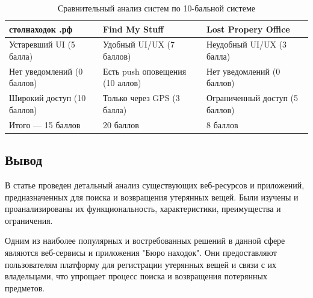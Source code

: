 \documentclass{mirea-article}
\begin{document}
	
	\begin{table}[htb]
		\caption{Сравнительный анализ систем по 10-бальной системе}
		\centering
		
		\emergencystretch=10pt
		\begin{tabular}{ | m{10em} | m{10em}| m{10em} | } 	
			\hline
			столнаходок .рф & Find My Stuff & Lost Propery Office \\ 
			\hline
			Устаревший UI (5 балла) & Удобный UI/UX (7 баллов) & Неудобный UI/UX (3 балла) \\ 
			\hline
			Нет уведомлений (0 баллов) & Есть push оповещения (10 аллов) & Нет уведомлений (0 баллов) \\ 
			\hline
			Широкий доступ (10 баллов) & Только через GPS (3 балла) & Ограничен\-ный доступ (5 баллов) \\ 
			\hline
			Итого --- 15 баллов & 20 баллов & 8 баллов \\ 
			\hline
		\end{tabular}
	\end{table}
	
	\subsection*{Вывод}
	
	В статье проведен детальный анализ существующих веб-ресурсов и приложений, предназначенных для поиска и возвращения утерянных вещей. Были изучены и проанализированы их функциональность, характеристики, преимущества и ограничения.
	
	Одним из наиболее популярных и востребованных решений в данной сфере являются веб-сервисы и приложения "Бюро находок". Они предоставляют пользователям платформу для регистрации утерянных вещей и связи с их владельцами, что упрощает процесс поиска и возвращения потерянных предметов.
	
\end{document}
